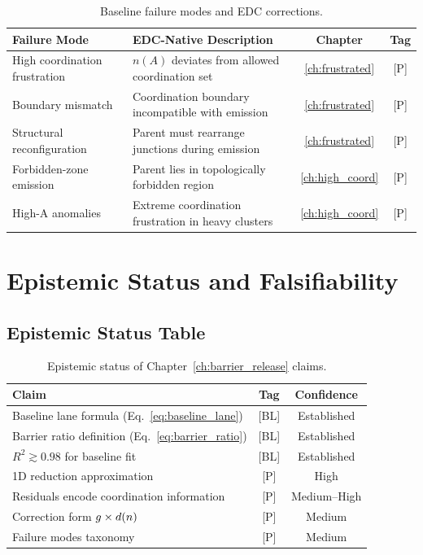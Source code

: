 \begin{table}[h]
\centering
\caption{Baseline failure modes and EDC corrections.}
\label{tab:failure}
\begin{tabular}{p{4cm}p{5cm}cc}
    \toprule
    Failure Mode & EDC-Native Description & Chapter & Tag \\
    \midrule
    High coordination frustration &
    $n(A)$ deviates from allowed coordination set &
    \ref{ch:frustrated} & [P] \\
    Boundary mismatch &
    Coordination boundary incompatible with emission &
    \ref{ch:frustrated} & [P] \\
    Structural reconfiguration &
    Parent must rearrange junctions during emission &
    \ref{ch:frustrated} & [P] \\
    Forbidden-zone emission &
    Parent lies in topologically forbidden region &
    \ref{ch:high_coord} & [P] \\
    High-A anomalies &
    Extreme coordination frustration in heavy clusters &
    \ref{ch:high_coord} & [P] \\
    \bottomrule
\end{tabular}
\end{table}

\section{Epistemic Status and Falsifiability}
\label{sec:gn:epistemic}

\subsection{Epistemic Status Table}

\begin{table}[h]
\centering
\caption{Epistemic status of Chapter~\ref{ch:barrier_release} claims.}
\label{tab:gn:epistemic}
\begin{tabular}{p{5.5cm}cc}
    \toprule
    Claim & Tag & Confidence \\
    \midrule
    Baseline lane formula (Eq.~\ref{eq:baseline_lane}) & [BL] & Established \\
    Barrier ratio definition (Eq.~\ref{eq:barrier_ratio}) & [BL] & Established \\
    $R^2 \gtrsim 0.98$ for baseline fit & [BL] & Established \\
    1D reduction approximation & [P] & High \\
    Residuals encode coordination information & [P] & Medium--High \\
    Correction form $g \times d(n)$ & [P] & Medium \\
    Failure modes taxonomy & [P] & Medium \\
    \bottomrule
\end{tabular}
\end{table}

